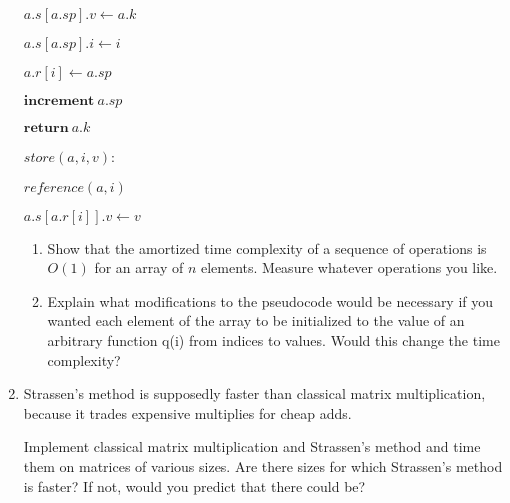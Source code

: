 \documentclass[11pt,letterpaper,oneside]{article}
\begin{document}
\begin{enumerate}
\hspace{3em}    $a.s[a.sp].v \leftarrow a.k$

\hspace{3em}    $a.s[a.sp].i \leftarrow i$ 

\hspace{3em}    $a.r[i] \leftarrow a.sp$

\hspace{3em}    $\textbf{increment}\ a.sp$

\hspace{3em}    $\textbf{return}\ a.k$

\null

\vspace{1em}\hspace{2em} $store(a, i, v)$: 

\hspace{3em}    $reference(a, i)$

\hspace{3em}    $a.s[a.r[i]].v \leftarrow v$

\null

\begin{enumerate} 
\item Show that the amortized time complexity of a sequence of operations is $O(1)$ for an array of $n$ elements. Measure whatever operations you like.
\item Explain what modifications to the pseudocode would be necessary if you wanted each element of the array to be initialized to the value of an arbitrary function q(i) from indices to values. Would this change the time complexity?
\end{enumerate}

  \item Strassen's method is supposedly faster than classical matrix multiplication, because it trades expensive multiplies for cheap adds.

Implement classical matrix multiplication and Strassen's method and time them on matrices of various sizes. Are there sizes for which Strassen's method is faster? If not, would you predict that there could be?

\end{enumerate}
\end{document}
